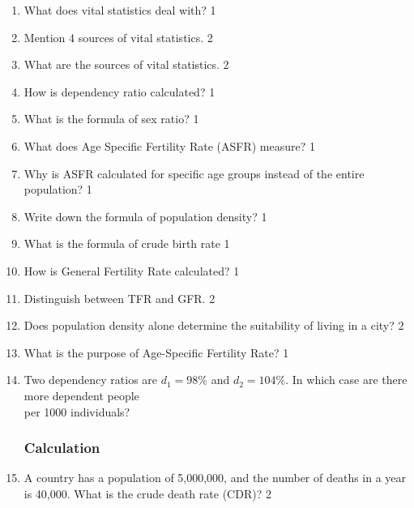 \documentclass[a4paper,oneside, margin=1.4in]{book}
\begin{document}
  \begin{enumerate}
  
  \item What does vital statistics deal with? \hfill 1
  
  \item Mention 4 sources of vital statistics. \hfill 2
  
  \item What are the sources of vital statistics. \hfill 2
  
  \item How is dependency ratio calculated? \hfill 1
  
  \item What is the formula of sex ratio? \hfill 1
  
 \item  What does Age Specific Fertility Rate (ASFR) measure? \hfill 1
 \item Why is ASFR calculated for specific age groups instead of the entire population? \hfill 1
  
  \item Write down the formula of population density? \hfill 1
  
  \item What is the formula of crude birth rate \hfill 1
  
  \item How is General Fertility Rate calculated? \hfill 1
  
  \item Distinguish between TFR and GFR. \hfill 2
  
  \item Does population density alone determine the suitability of living in a city? \hfill 2
  
  \item What is the purpose of Age-Specific Fertility Rate? \hfill 1
  
  \item Two dependency ratios are $d_1=98\%$ and $d_2=104\%$. 
  In which case are there more dependent people \\ per 1000 individuals? \hfill 
  
 \subsubsection{Calculation}
 
 \item A country has a population of 5,000,000, and the number of deaths in a year is 40,000. What is the crude death rate (CDR)? \hfill 2  


\end{enumerate}
\end{document}
